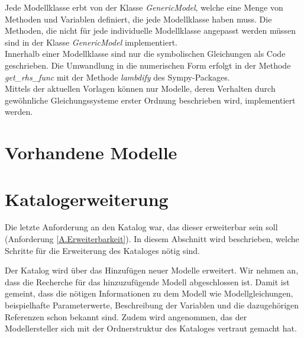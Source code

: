 Jede Modellklasse erbt von der Klasse \textit{GenericModel}, welche eine Menge von Methoden und Variablen definiert, die jede Modellklasse haben muss. Die Methoden, die nicht für jede individuelle Modellklasse angepasst werden müssen sind in der Klasse \textit{GenericModel} implementiert.\\
Innerhalb einer Modellklasse sind nur die symbolischen Gleichungen als Code geschrieben. Die Umwandlung in die numerischen Form erfolgt in der Methode \textit{get\_rhs\_func} mit der Methode \textit{lambdify} des Sympy-Packages.\\

Mittels der aktuellen Vorlagen können nur Modelle, deren Verhalten durch gewöhnliche Gleichungssysteme erster Ordnung beschrieben wird, implementiert werden.

\section{Vorhandene Modelle}
\label{Ch:Ergebnisse:Sec:Modelle}

\section{Katalogerweiterung}
\label{Ch:Ergebnisse:Sec:Erweiterung}
Die letzte Anforderung an den Katalog war, das dieser erweiterbar sein soll (Anforderung \ref{A.Erweiterbarkeit}). In diesem Abschnitt wird beschrieben, welche Schritte für die Erweiterung des Kataloges nötig sind. 

Der Katalog wird über das Hinzufügen neuer Modelle erweitert. Wir nehmen an, dass die Recherche für das hinzuzufügende Modell abgeschlossen ist. Damit ist gemeint, dass die nötigen Informationen zu dem Modell wie Modellgleichungen, beispielhafte Parameterwerte, Beschreibung der Variablen und die dazugehörigen Referenzen schon bekannt sind. Zudem wird angenommen, das der Modellersteller sich mit der Ordnerstruktur des Kataloges vertraut gemacht hat.\\

